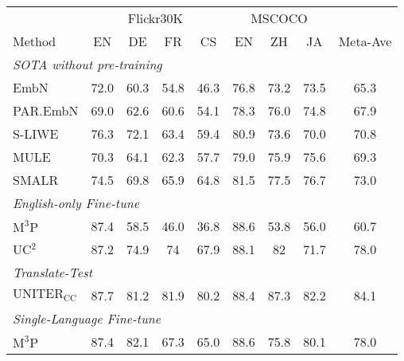 \documentclass[final]{cvpr}
\begin{document}
\begin{table*}[!]
\centering
\small
\begin{tabular}{lcccccccc}
\hline
& \multicolumn{4}{c}{Flickr30K} & \multicolumn{3}{c}{MSCOCO} & \\
Method  & EN  & DE   & FR                       & CS                         & EN                            & ZH                          & JA                            & Meta-Ave                          \\ \hline
\multicolumn{9}{l}{\textit{SOTA without pre-training}}\\
\hline
EmbN\cite{EMnb} & 72.0 & 60.3 & 54.8 & 46.3 & 76.8 & 73.2 & 73.5 & 65.3\\
PAR.EmbN \cite{Par.EMnb} & 69.0 & 62.6 & 60.6 & 54.1 & 78.3 & 76.0 & 74.8 & 67.9\\
S-LIWE \cite{S-LIWE} & 76.3 & 72.1 & 63.4 & 59.4 & 80.9 & 73.6 & 70.0 & 70.8\\
MULE \cite{MULE} & 70.3 & 64.1 & 62.3 & 57.7 & {\color[HTML]{0000FF}79.0} & {\color[HTML]{0000FF}75.9} & {\color[HTML]{0000FF}75.6} & 69.3 \\
SMALR \cite{SMALR} & 74.5 & 69.8 & 65.9 & 64.8 & {\color[HTML]{0000FF}81.5} & {\color[HTML]{0000FF}77.5} & {\color[HTML]{0000FF}76.7} & 73.0 \\
\hline
\multicolumn{9}{l}{\textit{English-only Fine-tune}}\\
\hline
$\text{M}^3\text{P}$\cite{huang2020m3p}                & 87.4                                   & 58.5                                 & 46.0                               & 36.8                                 & 88.6                                 & 53.8                               & 56.0                                 & 60.7                                \\ \hline
UC$^2$   & 87.2 & 74.9 & 74 & 67.9                                 & 88.1 & 82 & 71.7 & 78.0 \\ \hline
\multicolumn{9}{l}{\textit{Translate-Test}} \\
\hline
$\text{UNITER}_{\text{CC}}$\cite{UNITER} & 87.7  & 81.2  & 81.9  & 80.2 & 88.4 & 87.3 & 82.2 & 84.1  \\ \hline
\multicolumn{9}{l}{\textit{Single-Language Fine-tune}}\\
\hline
$\text{M}^3\text{P}$\cite{huang2020m3p}               & 87.4                                  & 82.1                                 & 67.3                               & 65.0                                 & 88.6                                 &75.8                              &  80.1                              & 78.0                                 \\ \hline

\end{tabular}
\end{table*}
\end{document}
